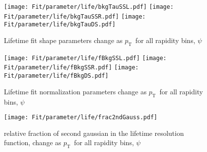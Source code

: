\documentclass[12pt]{article}
\newcommand{\pt}{$p_{\mathrm{T}}$}
\begin{document}
\begin{figure}[htbp]
\centering
\texttt{[image: Fit/parameter/life/bkgTauSSL.pdf]}
\texttt{[image: Fit/parameter/life/bkgTauSSR.pdf]}
\texttt{[image: Fit/parameter/life/bkgTauDS.pdf]}
\caption{Lifetime fit shape parameters change as \pt\ for all rapidity bins, $\psi$}
\end{figure}
\clearpage

\begin{figure}[htbp]
\centering
\texttt{[image: Fit/parameter/life/fBkgSSL.pdf]}
\texttt{[image: Fit/parameter/life/fBkgSSR.pdf]}
\texttt{[image: Fit/parameter/life/fBkgDS.pdf]}
\caption{Lifetime fit normalization parameters change as \pt\ for all rapidity bins, $\psi$}
\end{figure}
\clearpage

\begin{figure}[htbp]
\centering
\texttt{[image: Fit/parameter/life/frac2ndGauss.pdf]}
\caption{relative fraction of second gaussian in the lifetime resolution function, change as \pt\ for all rapidity bins, $\psi$}
\end{figure}
\clearpage
\end{document}
